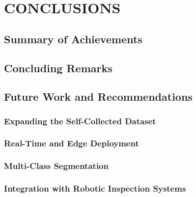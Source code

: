 \chapter{CONCLUSIONS}

\section{Summary of Achievements}
\label{sec:summary_achievements}

\section{Concluding Remarks}
\label{sec:concluding_remarks}

\section{Future Work and Recommendations}
\label{sec:future_work}

\subsection{Expanding the Self-Collected Dataset}
\label{subsec:expanding_dataset}

\subsection{Real-Time and Edge Deployment}
\label{subsec:real_time_deployment}

\subsection{Multi-Class Segmentation}
\label{subsec:multi_class_segmentation}

\subsection{Integration with Robotic Inspection Systems}
\label{subsec:robotic_integration}